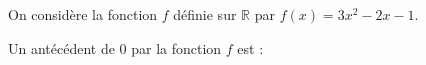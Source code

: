 
On considère la fonction $f$ définie sur $\mathbb{R}$ par $f(x)=3x^2-2x-1$.

Un antécédent de $0$ par la fonction $f$ est :

\smallskip
{}
